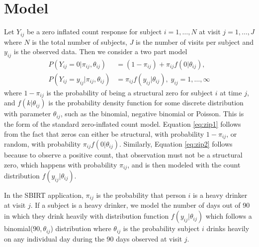 \documentclass[12pt]{article}
\begin{document}
\section{Model}
\label{s:model}

Let $Y_{ij}$ be a zero inflated count response for subject $i=1,\dots,N$ at visit $j=1, \dots, J$ where $N$ is the total number of subjects, $J$ is the number of visits per subject and $y_{ij}$ is the observed data. Then we consider a two part model
\begin{align}
	P(Y_{ij} = 0 | \pi_{ij}, \theta_{ij}) &= (1 - \pi_{ij}) + \pi_{ij} f(0 | \theta_{ij}), \label{eq:zip1} \\
	P(Y_{ij} = y_{ij} | \pi_{ij}, \theta_{ij}) &= \pi_{ij} f(y_{ij}| \theta_{ij}), \; y_{ij}=1, \dots, \infty \label{eq:zip2}
\end{align}
where $1-\pi_{ij}$ is the probability of being a structural zero for subject $i$ at time $j$, and $f(k| \theta_{ij})$ is the probability density function for some discrete distribution with parameter $\theta_{ij}$, such as the binomial, negative binomial or Poisson. This is the form of the standard zero-inflated count model. Equation \eqref{eq:zip1} follows from the fact that zeros can either be structural, with probability $1-\pi_{ij}$, or random, with probability $\pi_{ij} f(0 | \theta_{ij})$. Similarly, Equation \eqref{eq:zip2} follows because to observe a positive count, that observation must not be a structural zero, which happens with probability $\pi_{ij}$, and is then modeled with the count distribution $f(y_{ij}| \theta_{ij})$.

In the SBIRT application, $\pi_{ij}$ is the probability that person $i$ is a heavy drinker at visit $j$. If a subject is a heavy drinker, we model the number of days out of 90 in which they drink heavily with distribution function $f(y_{ij}| \theta_{ij})$ which follows a binomial($90, \theta_{ij}$) distribution where $\theta_{ij}$ is the probability subject $i$ drinks heavily on any individual day during the 90 days observed at visit $j$. 
\end{document}
